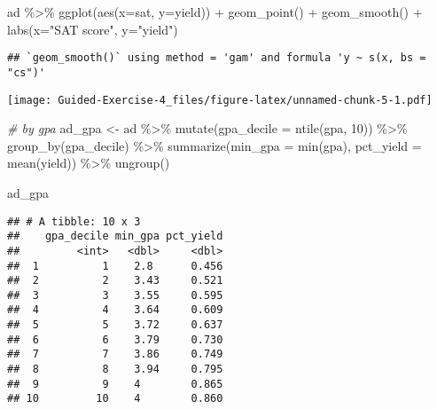\documentclass[
]{article}
\newenvironment{Shaded}{\begin{snugshade}}{\end{snugshade}}
\newcommand{\AttributeTok}[1]{\textcolor[rgb]{0.77,0.63,0.00}{#1}}
\newcommand{\CommentTok}[1]{\textcolor[rgb]{0.56,0.35,0.01}{\textit{#1}}}
\newcommand{\DecValTok}[1]{\textcolor[rgb]{0.00,0.00,0.81}{#1}}
\newcommand{\FunctionTok}[1]{\textcolor[rgb]{0.00,0.00,0.00}{#1}}
\newcommand{\NormalTok}[1]{#1}
\newcommand{\OtherTok}[1]{\textcolor[rgb]{0.56,0.35,0.01}{#1}}
\newcommand{\SpecialCharTok}[1]{\textcolor[rgb]{0.00,0.00,0.00}{#1}}
\newcommand{\StringTok}[1]{\textcolor[rgb]{0.31,0.60,0.02}{#1}}
\begin{document}
\begin{Shaded}
\begin{Highlighting}[]
\NormalTok{ad }\SpecialCharTok{\%\textgreater{}\%}
  \FunctionTok{ggplot}\NormalTok{(}\FunctionTok{aes}\NormalTok{(}\AttributeTok{x=}\NormalTok{sat, }\AttributeTok{y=}\NormalTok{yield)) }\SpecialCharTok{+}
  \FunctionTok{geom\_point}\NormalTok{() }\SpecialCharTok{+}
  \FunctionTok{geom\_smooth}\NormalTok{() }\SpecialCharTok{+} 
  \FunctionTok{labs}\NormalTok{(}\AttributeTok{x=}\StringTok{"SAT score"}\NormalTok{, }\AttributeTok{y=}\StringTok{"yield"}\NormalTok{)}
\end{Highlighting}
\end{Shaded}

\begin{verbatim}
## `geom_smooth()` using method = 'gam' and formula 'y ~ s(x, bs = "cs")'
\end{verbatim}

\texttt{[image: Guided-Exercise-4\_files/figure-latex/unnamed-chunk-5-1.pdf]}

\begin{Shaded}
\begin{Highlighting}[]
\CommentTok{\# by gpa}
\NormalTok{ad\_gpa }\OtherTok{\textless{}{-}}\NormalTok{ ad }\SpecialCharTok{\%\textgreater{}\%}
  \FunctionTok{mutate}\NormalTok{(}\AttributeTok{gpa\_decile =} \FunctionTok{ntile}\NormalTok{(gpa, }\DecValTok{10}\NormalTok{)) }\SpecialCharTok{\%\textgreater{}\%}
  \FunctionTok{group\_by}\NormalTok{(gpa\_decile) }\SpecialCharTok{\%\textgreater{}\%}
  \FunctionTok{summarize}\NormalTok{(}\AttributeTok{min\_gpa =} \FunctionTok{min}\NormalTok{(gpa),}
            \AttributeTok{pct\_yield =} \FunctionTok{mean}\NormalTok{(yield)) }\SpecialCharTok{\%\textgreater{}\%}
  \FunctionTok{ungroup}\NormalTok{() }

\NormalTok{ad\_gpa}
\end{Highlighting}
\end{Shaded}

\begin{verbatim}
## # A tibble: 10 x 3
##    gpa_decile min_gpa pct_yield
##         <int>   <dbl>     <dbl>
##  1          1    2.8      0.456
##  2          2    3.43     0.521
##  3          3    3.55     0.595
##  4          4    3.64     0.609
##  5          5    3.72     0.637
##  6          6    3.79     0.730
##  7          7    3.86     0.749
##  8          8    3.94     0.795
##  9          9    4        0.865
## 10         10    4        0.860
\end{verbatim}
\end{document}
